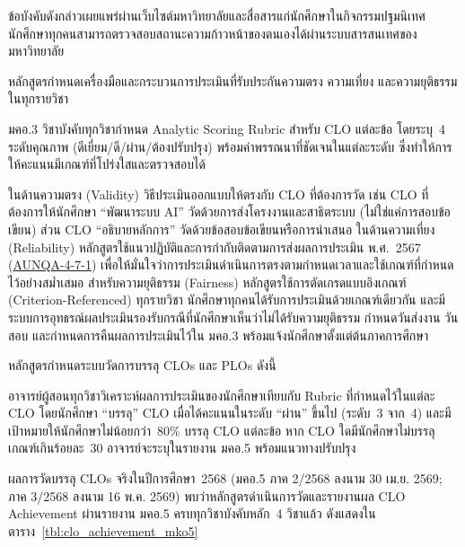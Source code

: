 ข้อบังคับดังกล่าวเผยแพร่ผ่านเว็บไซต์มหาวิทยาลัยและสื่อสารแก่นักศึกษาในกิจกรรมปฐมนิเทศ นักศึกษาทุกคนสามารถตรวจสอบสถานะความก้าวหน้าของตนเองได้ผ่านระบบสารสนเทศของมหาวิทยาลัย


หลักสูตรกำหนดเครื่องมือและกระบวนการประเมินที่รับประกันความตรง ความเที่ยง และความยุติธรรมในทุกรายวิชา

มคอ.3 วิชาบังคับทุกวิชากำหนด Analytic Scoring Rubric สำหรับ CLO แต่ละข้อ โดยระบุ~4 ระดับคุณภาพ (ดีเยี่ยม/ดี/ผ่าน/ต้องปรับปรุง) พร้อมคำพรรณนาที่ชัดเจนในแต่ละระดับ ซึ่งทำให้การให้คะแนนมีเกณฑ์ที่โปร่งใสและตรวจสอบได้

ในด้านความตรง (Validity) วิธีประเมินออกแบบให้ตรงกับ CLO ที่ต้องการวัด เช่น CLO ที่ต้องการให้นักศึกษา ``พัฒนาระบบ AI'' วัดด้วยการส่งโครงงานและสาธิตระบบ (ไม่ใช่แค่การสอบข้อเขียน) ส่วน CLO ``อธิบายหลักการ'' วัดด้วยข้อสอบข้อเขียนหรือการนำเสนอ ในด้านความเที่ยง (Reliability) หลักสูตรใช้แนวปฏิบัติและการกำกับติดตามการส่งผลการประเมิน พ.ศ.~2567 (\hyperlink{ref:AUNQA-4-7-1}{AUNQA-4-7-1}) เพื่อให้มั่นใจว่าการประเมินดำเนินการตรงตามกำหนดเวลาและใช้เกณฑ์ที่กำหนดไว้อย่างสม่ำเสมอ สำหรับความยุติธรรม (Fairness) หลักสูตรใช้การตัดเกรดแบบอิงเกณฑ์ (Criterion-Referenced) ทุกรายวิชา นักศึกษาทุกคนได้รับการประเมินด้วยเกณฑ์เดียวกัน และมีระบบการอุทธรณ์ผลประเมินรองรับกรณีที่นักศึกษาเห็นว่าไม่ได้รับความยุติธรรม กำหนดวันส่งงาน วันสอบ และกำหนดการคืนผลการประเมินไว้ใน มคอ.3 พร้อมแจ้งนักศึกษาตั้งแต่ต้นภาคการศึกษา


หลักสูตรกำหนดระบบวัดการบรรลุ CLOs และ PLOs ดังนี้

อาจารย์ผู้สอนทุกวิชาวิเคราะห์ผลการประเมินของนักศึกษาเทียบกับ Rubric ที่กำหนดไว้ในแต่ละ CLO โดยนักศึกษา ``บรรลุ'' CLO เมื่อได้คะแนนในระดับ ``ผ่าน'' ขึ้นไป (ระดับ~3 จาก~4) และมีเป้าหมายให้นักศึกษาไม่น้อยกว่า~80\% บรรลุ CLO แต่ละข้อ หาก CLO ใดมีนักศึกษาไม่บรรลุเกณฑ์เกินร้อยละ~30 อาจารย์จะระบุในรายงาน มคอ.5 พร้อมแนวทางปรับปรุง

ผลการวัดบรรลุ CLOs จริงในปีการศึกษา~2568 (มคอ.5 ภาค 2/2568 ลงนาม 30 เม.ย. 2569; ภาค 3/2568 ลงนาม 16 พ.ค. 2569) พบว่าหลักสูตรดำเนินการวัดและรายงานผล CLO Achievement ผ่านรายงาน มคอ.5 ครบทุกวิชาบังคับหลัก~4 วิชาแล้ว ดังแสดงในตาราง~\ref{tbl:clo_achievement_mko5}


